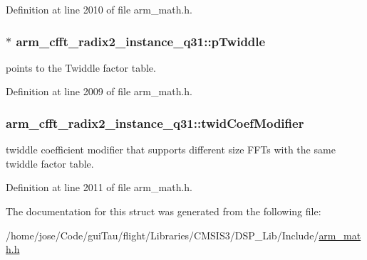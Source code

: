 Definition at line 2010 of file arm\-\_\-math.\-h.

\hypertarget{structarm__cfft__radix2__instance__q31_a1d5bbe9a991e133f81652a77a7985d23}{
\subsubsection[{p\-Twiddle}]{$\ast$ arm\-\_\-cfft\-\_\-radix2\-\_\-instance\-\_\-q31\-::p\-Twiddle}}\label{structarm__cfft__radix2__instance__q31_a1d5bbe9a991e133f81652a77a7985d23}
points to the Twiddle factor table. 

Definition at line 2009 of file arm\-\_\-math.\-h.

\hypertarget{structarm__cfft__radix2__instance__q31_ae63ca9193322cd477970c1d2086407d1}{
\subsubsection[{twid\-Coef\-Modifier}]{ arm\-\_\-cfft\-\_\-radix2\-\_\-instance\-\_\-q31\-::twid\-Coef\-Modifier}}\label{structarm__cfft__radix2__instance__q31_ae63ca9193322cd477970c1d2086407d1}
twiddle coefficient modifier that supports different size F\-F\-Ts with the same twiddle factor table. 

Definition at line 2011 of file arm\-\_\-math.\-h.



The documentation for this struct was generated from the following file\-:\begin{DoxyCompactItemize}
\item 
/home/jose/\-Code/gui\-Tau/flight/\-Libraries/\-C\-M\-S\-I\-S3/\-D\-S\-P\-\_\-\-Lib/\-Include/\hyperlink{arm__math_8h}{arm\-\_\-math.\-h}\end{DoxyCompactItemize}
